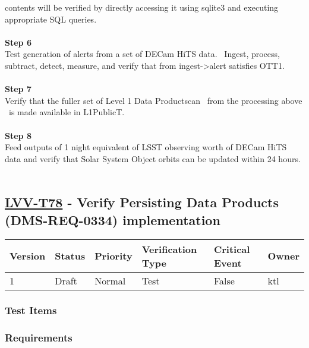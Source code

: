 contents will be verified by directly accessing it using sqlite3 and
executing appropriate SQL queries.\\
~\\
\textbf{Step 6}\\
Test generation of alerts from a set of DECam HiTS data. ~Ingest,
process, subtract, detect, measure, and verify that from
ingest-\textgreater{}alert satisfies OTT1.\\
~\\
\textbf{Step 7}\\
Verify that the fuller set of Level 1 Data Productscan ~from the
processing above ~is made available in L1PublicT.\\
~\\
\textbf{Step 8}\\
Feed outputs of 1 night equivalent of LSST observing worth of DECam HiTS
data and verify that Solar System Object orbits can be updated within 24
hours.\\
~\\

\hypertarget{lvv-t78---verify-persisting-data-products-dms-req-0334-implementation}{%
\subsection{\texorpdfstring{\href{https://jira.lsstcorp.org/secure/Tests.jspa\#/testCase/LVV-T78}{LVV-T78}
- Verify Persisting Data Products (DMS-REQ-0334)
implementation}{LVV-T78 - Verify Persisting Data Products (DMS-REQ-0334) implementation}}\label{lvv-t78---verify-persisting-data-products-dms-req-0334-implementation}}

\begin{longtable}[]{@{}llllll@{}}
\toprule
Version & Status & Priority & Verification Type & Critical Event &
Owner\tabularnewline
\midrule
\endhead
1 & Draft & Normal & Test & False & ktl\tabularnewline
\bottomrule
\end{longtable}

\hypertarget{test-items-25}{%
\subsubsection{Test Items}\label{test-items-25}}

\hypertarget{requirements-50}{%
\subsubsection{Requirements}\label{requirements-50}}

